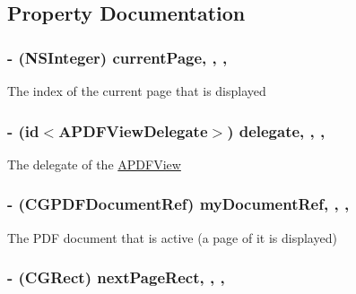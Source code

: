 \subsection{Property Documentation}
\hypertarget{interface_a_p_d_f_view_a0b65e4af25d04f030c8d56e5bc9420ba}{
\subsubsection[{current\-Page}]{\setlength{\rightskip}{0pt plus 5cm}-\/ (N\-S\-Integer) current\-Page\hspace{0.3cm}{\ttfamily [read]}, {\ttfamily [write]}, {\ttfamily [nonatomic]}, {\ttfamily [assign]}}}\label{interface_a_p_d_f_view_a0b65e4af25d04f030c8d56e5bc9420ba}
The index of the current page that is displayed \hypertarget{interface_a_p_d_f_view_ad971242eaf334f887a4346d92f1587d9}{
\subsubsection[{delegate}]{\setlength{\rightskip}{0pt plus 5cm}-\/ (id$<${\bf A\-P\-D\-F\-View\-Delegate}$>$) delegate\hspace{0.3cm}{\ttfamily [read]}, {\ttfamily [write]}, {\ttfamily [nonatomic]}, {\ttfamily [assign]}}}\label{interface_a_p_d_f_view_ad971242eaf334f887a4346d92f1587d9}
The delegate of the \hyperlink{interface_a_p_d_f_view}{A\-P\-D\-F\-View} \hypertarget{interface_a_p_d_f_view_abfd40cc20df359fde8d000a80c2b07b1}{
\subsubsection[{my\-Document\-Ref}]{\setlength{\rightskip}{0pt plus 5cm}-\/ (C\-G\-P\-D\-F\-Document\-Ref) my\-Document\-Ref\hspace{0.3cm}{\ttfamily [read]}, {\ttfamily [write]}, {\ttfamily [nonatomic]}, {\ttfamily [assign]}}}\label{interface_a_p_d_f_view_abfd40cc20df359fde8d000a80c2b07b1}
The P\-D\-F document that is active (a page of it is displayed) \hypertarget{interface_a_p_d_f_view_a00c74386673969efcb36e654be9ab04e}{
\subsubsection[{next\-Page\-Rect}]{\setlength{\rightskip}{0pt plus 5cm}-\/ (C\-G\-Rect) next\-Page\-Rect\hspace{0.3cm}{\ttfamily [read]}, {\ttfamily [write]}, {\ttfamily [nonatomic]}, {\ttfamily [assign]}}}\label{interface_a_p_d_f_view_a00c74386673969efcb36e654be9ab04e}
